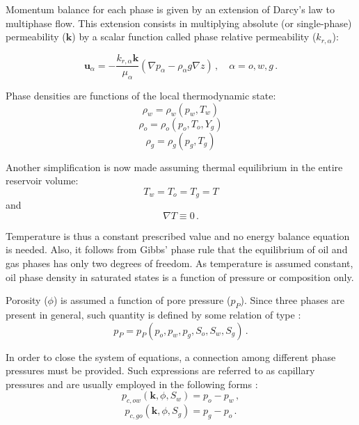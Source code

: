 \documentclass[authoryear,preprint,review,12pt]{elsarticle}
\begin{document}
Momentum balance for each phase is given by an extension of Darcy's law to multiphase flow. This extension consists in multiplying absolute (or single-phase) permeability ($\mathbf{k}$) by a scalar function called phase relative permeability ($k_{r,\alpha}$):

\begin{equation}\label{eq: exdarcy}
\mathbf{u}_\alpha = -\frac{k_{r,\alpha} \mathbf{k}}{\mu_\alpha} \left(\nabla p_\alpha - \rho_\alpha g\nabla z\right) \, , \quad \alpha=o,w,g \, .
\end{equation}

Phase densities are functions of the local thermodynamic state:
\begin{equation}
\rho_w = \rho_w \left(p_w, T_w\right)
\end{equation}
\begin{equation}
\rho_o = \rho_o \left(p_o, T_o,Y_g\right)
\end{equation}
\begin{equation}
\rho_g = \rho_g \left(p_g, T_g\right)
\end{equation}

Another simplification is now made assuming thermal equilibrium in the entire reservoir volume:
\begin{equation}
T_w = T_o = T_g = T
\end{equation}
and
\begin{equation}
\nabla T \equiv 0 \, .
\end{equation}

Temperature is thus a constant prescribed value and no energy balance equation is needed. Also, it follows from Gibbs' phase rule that the equilibrium of oil and gas phases has only two degrees of freedom. As temperature is assumed constant, oil phase density in saturated states is a function of pressure or composition only.

Porosity ($\phi$) is assumed a function of pore pressure ($p_P$). Since three phases are present in general, such quantity is defined by some relation of type \citep{kim2011rigorous}:
\begin{equation}
p_P=p_P\left(p_o,p_w,p_g,S_o,S_w,S_g\right) \, .
\end{equation}

In order to close the system of equations, a connection among different phase pressures must be provided. Such expressions are referred to as capillary pressures and are usually employed in the following forms \citep{aziz1979petroleum}:
\begin{equation}\label{eq: capillary_ow}
p_{c,ow}\left(\mathbf{k},\phi,S_w\right)=p_o-p_w \, ,
\end{equation}
\begin{equation}\label{eq: capillary_og}
p_{c,go}\left(\mathbf{k},\phi,S_g\right)=p_g-p_o \, .
\end{equation}
\end{document}
